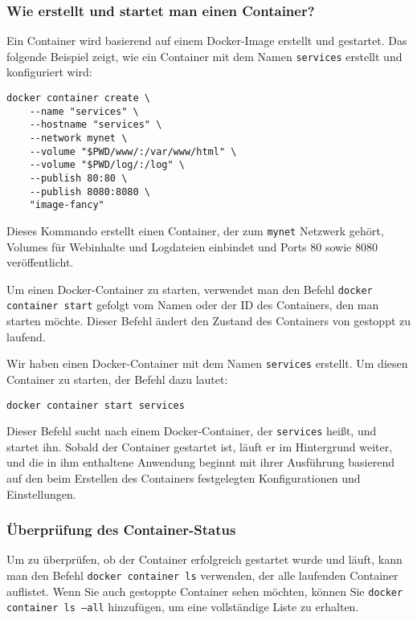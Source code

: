 \subsubsection{Wie erstellt und startet man einen Container?}

Ein Container wird basierend auf einem Docker-Image erstellt und gestartet. Das folgende Beispiel zeigt, wie ein Container mit dem Namen \texttt{services} erstellt und konfiguriert wird:

\begin{verbatim}
docker container create \
    --name "services" \
    --hostname "services" \
    --network mynet \
    --volume "$PWD/www/:/var/www/html" \
    --volume "$PWD/log/:/log" \
    --publish 80:80 \
    --publish 8080:8080 \
    "image-fancy"
\end{verbatim}

Dieses Kommando erstellt einen Container, der zum \texttt{mynet} Netzwerk gehört, Volumes für Webinhalte und Logdateien einbindet und Ports 80 sowie 8080 veröffentlicht.

Um einen Docker-Container zu starten, verwendet man den Befehl \texttt{docker container start} gefolgt vom Namen oder der ID des Containers, den man starten möchte. Dieser Befehl ändert den Zustand des Containers von gestoppt zu laufend.

Wir haben einen Docker-Container mit dem Namen \texttt{services} erstellt. Um diesen Container zu starten, der Befehl dazu lautet:

\begin{verbatim}
docker container start services
\end{verbatim}

Dieser Befehl sucht nach einem Docker-Container, der \texttt{services} heißt, und startet ihn. Sobald der Container gestartet ist, läuft er im Hintergrund weiter, und die in ihm enthaltene Anwendung beginnt mit ihrer Ausführung basierend auf den beim Erstellen des Containers festgelegten Konfigurationen und Einstellungen.

\subsubsection{Überprüfung des Container-Status}

Um zu überprüfen, ob der Container erfolgreich gestartet wurde und läuft, kann man den Befehl \texttt{docker container ls} verwenden, der alle laufenden Container auflistet. Wenn Sie auch gestoppte Container sehen möchten, können Sie \texttt{docker container ls --all} hinzufügen, um eine vollständige Liste zu erhalten.

